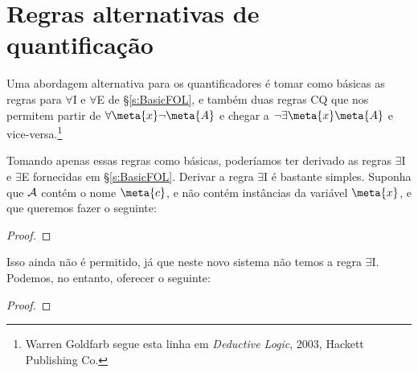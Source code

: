 \section{Regras alternativas de quantificação}
Uma abordagem alternativa para os quantificadores é tomar como básicas as regras para $\forall$I e $\forall$E de \S\ref{s:BasicFOL}, e também duas regras CQ que nos permitem partir de $\forall \meta{x} \enot \meta{A}$ e chegar a $\enot \exists \meta{x} \meta{A}$ e vice-versa.\footnote{Warren Goldfarb segue esta linha em \emph{Deductive Logic}, 2003, Hackett Publishing Co.}

Tomando apenas essas regras como básicas, poderíamos ter derivado as regras $\exists$I e $\exists$E fornecidas em \S\ref{s:BasicFOL}. Derivar a regra $\exists$I é bastante simples. Suponha que $\mathcal{A}$ contém o nome $\meta{c}$, e não contém instâncias da variável $\meta{x}$, e que queremos fazer o seguinte: 

\begin{proof}
\end{proof}

Isso ainda não é permitido, já que neste novo sistema não temos a regra $\exists$I. Podemos, no entanto, oferecer o seguinte:

\begin{proof}
	\open
	\close
\end{proof}\noindent

